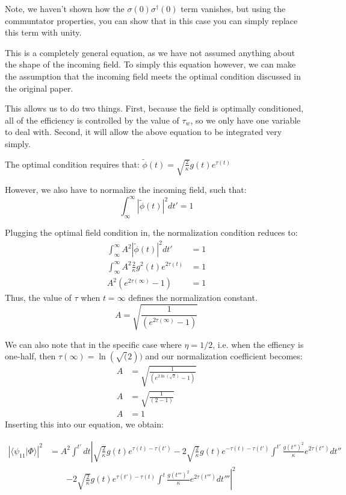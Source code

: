 \documentclass[12pt]{article}
\begin{document}
Note, we haven't shown how the $\sigma(0) \sigma^\dagger(0)$ term vanishes, but using the communtator properties, you can show that in this case you can simply replace this term with unity.

This is a completely general equation, as we have not assumed anything about the shape of the incoming field. 
To simply this equation however, we can make the assumption that the incoming field meets the optimal condition discussed
in the original paper.

This allows us to do two things. First, because the field is optimally conditioned, all of the efficiency is controlled by the value of $\tau_w$, so we only have one variable to deal with. Second, it will allow the above equation to be integrated very simply.

The optimal condition requires that: $\tilde{\phi}(t) = \sqrt{\frac{2}{\kappa}} g(t) e^{\tau(t)}$

However, we also have to normalize the incoming field, such that:
\begin{equation}
\int^\infty_\infty | \tilde{\phi}(t) |^2 dt' =1
\end{equation}

Plugging the optimal field condition in, the normalization condition reduces to:
\begin{align}
\int^\infty_\infty A^2| \tilde{\phi}(t) |^2 dt' &=1\\
\int^\infty_\infty A^2 \frac{2}{\kappa} g^2(t) e^{2\tau(t)} &=1\\
 A^2 \left( e^{2\tau(\infty)} -1\right)&=1
 \end{align}
 Thus, the value of $\tau$ when $t=\infty$ defines the normalization constant. 
 \begin{equation}
 A = \sqrt{\frac{1}{\left(  e^{2\tau(\infty)} -1\right)}}
 \end{equation}

 We can also note that in the specific case where $\eta = 1/2$, i.e. when the effiency is one-half, then $\tau(\infty) = \ln(\sqrt(2))$ and our normalization coefficient becomes:
 \begin{align}
 A &= \sqrt{\frac{1}{\left(  e^{2\ln(\sqrt{2})} -1\right)}}\\
 A &= \sqrt{\frac{1}{\left( 2-1 \right ) }}\\
 A &= 1
 \end{align}
Inserting this into our equation, we obtain:

\begin{align}
\left | \langle \psi_{11} | \Phi \rangle \right | ^2 &= A^2\int^{t'} dt \left | \sqrt{\frac{2}{\kappa}} g(t) e^{\tau(t)-\tau(t')} \right.
      -2\sqrt{\frac{2}{\kappa}}g(t) e^{-\tau(t)-\tau(t')} \int^{t'} \frac{g(t'')^2}{\kappa} e^{2\tau(t'')} dt'' \\
       &\qquad \left.-2\sqrt{\frac{2}{\kappa}} g(t) e^{\tau(t')-\tau(t)} \int^t \frac{g(t''')^2}{\kappa} e^{2\tau(t''')} dt'''\right |^2
\end{align}
\end{document}
